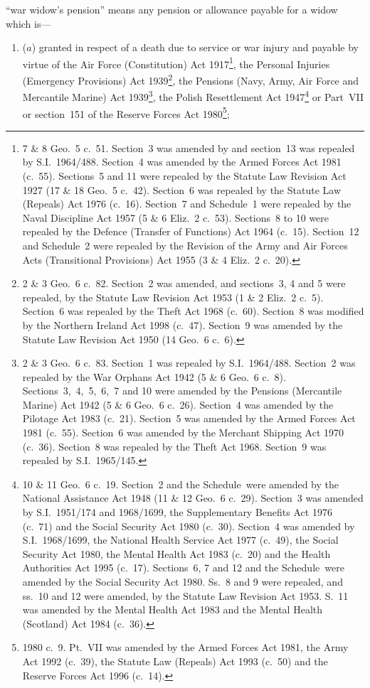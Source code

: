 \documentclass[12pt,a4paper]{article}
\begin{document}
\begin{enumerate}
“war widow’s pension” means any pension or allowance payable for a widow which is—
\begin{enumerate}\item[]
($a$) 
granted in respect of a death due to service or war injury and payable by virtue of the Air Force (Constitution) Act 1917\footnote{7 \& 8 Geo.~5 c.\ 51. Section~3 was amended by and section~13 was repealed by S.I.~1964/488. Section~4 was amended by the Armed Forces Act 1981 (c.\ 55). Sections~5 and 11 were repealed by the Statute Law Revision Act 1927 (17 \& 18 Geo.\ 5 c.\ 42). Section~6 was repealed by the Statute Law (Repeals) Act 1976 (c.\ 16). Section~7 and Schedule~1 were repealed by the Naval Discipline Act 1957 (5 \& 6 Eliz.~2 c.\ 53). Sections~8 to 10 were repealed by the Defence (Transfer of Functions) Act 1964 (c.\ 15). Section~12 and Schedule~2 were repealed by the Revision of the Army and Air Forces Acts (Transitional Provisions) Act 1955 (3 \& 4 Eliz.~2 c.\ 20).}, the Personal Injuries (Emergency Provisions) Act 1939\footnote{2 \& 3 Geo.\ 6 c.\ 82. Section~2 was amended, and sections~3, 4 and 5 were repealed, by the Statute Law Revision Act 1953 (1 \& 2 Eliz.~2 c.~5). Section~6 was repealed by the Theft Act 1968 (c.\ 60). Section~8 was modified by the Northern Ireland Act 1998 (c.\ 47). Section~9 was amended by the Statute Law Revision Act 1950 (14 Geo.\ 6 c.\ 6).}, the Pensions (Navy, Army, Air Force and Mercantile Marine) Act 1939\footnote{2 \& 3 Geo.\ 6 c.\ 83. Section~1 was repealed by S.I.~1964/488. Section~2 was repealed by the War Orphans Act 1942 (5 \& 6 Geo.\ 6 c.\ 8). Sections~3,~4,~5,~6,~7 and 10 were amended by the Pensions (Mercantile Marine) Act 1942 (5 \& 6 Geo.\ 6 c.\ 26). Section~4 was amended by the Pilotage Act 1983 (c.\ 21). Section~5 was amended by the Armed Forces Act 1981 (c.\ 55). Section~6 was amended by the Merchant Shipping Act 1970 (c.\ 36). Section~8 was repealed by the Theft Act 1968. Section~9 was repealed by S.I.~1965/145.}, the Polish Resettlement Act 1947\footnote{10 \& 11 Geo.\ 6 c.\ 19. Section~2 and the Schedule~were amended by the National Assistance Act 1948 (11 \& 12 Geo.\ 6 c.\ 29). Section~3 was amended by S.I.~1951/174 and 1968/1699, the Supplementary Benefits Act 1976 (c.\ 71) and the Social Security Act 1980 (c.\ 30). Section~4 was amended by S.I.~1968/1699, the National Health Service Act 1977 (c.\ 49), the Social Security Act 1980, the Mental Health Act 1983 (c.\ 20) and the Health Authorities Act 1995 (c.\ 17). Sections~6, 7 and 12 and the Schedule~were amended by the Social Security Act 1980. Ss.~8 and 9 were repealed, and ss.~10 and 12 were amended, by the Statute Law Revision Act 1953. S.~11 was amended by the Mental Health Act 1983 and the Mental Health (Scotland) Act 1984 (c.~36).} or Part~VII or section~151 of the Reserve Forces Act 1980\footnote{1980 c.\ 9. Pt.~VII was amended by the Armed Forces Act 1981, the Army Act 1992 (c.\ 39), the Statute Law (Repeals) Act 1993 (c.\ 50) and the Reserve Forces Act 1996 (c.~14).};


\end{enumerate}
\end{enumerate}
\end{document}
